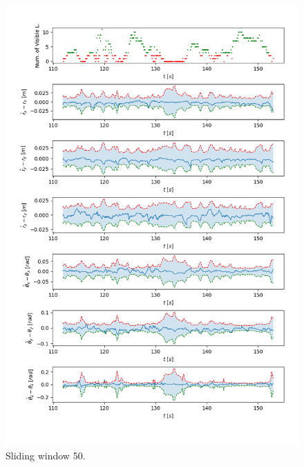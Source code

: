\documentclass[a4paper]{article}
\begin{document}
\begin{figure}[H]
    \centering
    \includegraphics[width=\textwidth]{code/sliding_window_50.png}
    \caption{Sliding window 50.}
    \label{fig:5b}
\end{figure}
\end{document}
